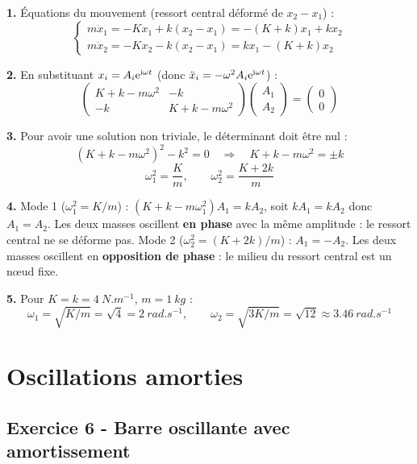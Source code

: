 \documentclass[12pt,a4paper]{article}
\begin{document}
\begin{boitecorrige}
\textbf{1.} Équations du mouvement (ressort central déformé de $x_2-x_1$) :
\[
\begin{cases}
m\ddot x_1 = -Kx_1 + k(x_2-x_1) = -(K+k)x_1 + kx_2\\
m\ddot x_2 = -Kx_2 - k(x_2-x_1) = kx_1 - (K+k)x_2
\end{cases}
\]

\textbf{2.} En substituant $x_i = A_i\mathrm{e}^{\mathrm{i}\omega t}$ (donc $\ddot x_i = -\omega^2 A_i\mathrm{e}^{\mathrm{i}\omega t}$) :
\[
\begin{pmatrix}K+k-m\omega^2 & -k\\ -k & K+k-m\omega^2\end{pmatrix}\begin{pmatrix}A_1\\A_2\end{pmatrix} = \begin{pmatrix}0\\0\end{pmatrix}
\]

\textbf{3.} Pour avoir une solution non triviale, le déterminant doit être nul :
\[
(K+k-m\omega^2)^2 - k^2 = 0 \quad\Longrightarrow\quad K+k-m\omega^2 = \pm k
\]
\[
\omega_1^2 = \frac{K}{m}, \qquad \omega_2^2 = \frac{K+2k}{m}
\]

\textbf{4.} Mode 1 ($\omega_1^2 = K/m$) : $(K+k-m\omega_1^2)A_1 = kA_2$, soit $kA_1 = kA_2$ donc $A_1 = A_2$. Les deux masses oscillent \textbf{en phase} avec la même amplitude : le ressort central ne se déforme pas. Mode 2 ($\omega_2^2 = (K+2k)/m$) : $A_1 = -A_2$. Les deux masses oscillent en \textbf{opposition de phase} : le milieu du ressort central est un n\oe{}ud fixe.

\textbf{5.} Pour $K=k=\qty{4}{N.m^{-1}}$, $m=\qty{1}{kg}$ :
\[
\omega_1 = \sqrt{K/m} = \sqrt{4} = \qty{2}{rad.s^{-1}}, \qquad \omega_2 = \sqrt{3K/m} = \sqrt{12} \approx \qty{3.46}{rad.s^{-1}}
\]
\end{boitecorrige}


\section{Oscillations amorties}

\subsection*{Exercice 6 - Barre oscillante avec amortissement \niveau{\moyen}}
\end{document}

